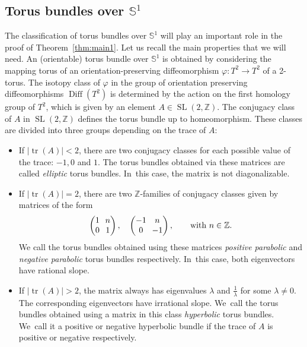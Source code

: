 \documentclass[JEP,XML,SOM,Unicode,NoEqCountersInSection,NoFloatCountersInSection,published]{cedram}
\DeclareMathOperator{\SL}{SL}
\theoremstyle{definition}
\begin{document}
\subsection{Torus bundles over $\mathbb{S}^1$}
The classification of torus bundles over $\mathbb{S}^1$ will play an important role in the proof of Theorem~\ref{thm:main1}. Let us recall the main properties that we will need. An (orientable) torus bundle over $\mathbb{S}^1$ is obtained by considering the mapping torus of an orientation-preserving diffeomorphism $\varphi:T^2\to T^2$ of a 2-torus. The isotopy class of $\varphi$ in the group of orientation preserving diffeomorphisms $\operatorname{Diff}(T^2)$ is determined by the action on the first homology group of $T^2$, which is given by an element $A\in \SL(2,\mathbb{Z})$.
The conjugacy class of $A$ in $\SL(2,\mathbb{Z})$ defines the torus bundle up to homeomorphism. These classes are divided into three groups depending on the trace of $A$:
\begin{itemize}
\item
If $|{\operatorname{tr}(A)}|<2$, there are two conjugacy classes for each possible value of the trace: $-1, 0$ and $1$. The torus bundles obtained via these matrices are called \textit{elliptic} torus bundles. In~this case, the matrix is not diagonalizable.
\item
If $|{\operatorname{tr}(A)}|=2$, there are two $\mathbb{Z}$-families of conjugacy classes given by matrices of the form
\[
\arraycolsep3.5pt
\begin{pmatrix}
1 & n \\
0 & 1
\end{pmatrix},\quad \begin{pmatrix}
-1 & n \\
0 & -1
\end{pmatrix}, \qquad\text{with } n\in \mathbb{Z}.
\]
We call the torus bundles obtained using these matrices \textit{positive parabolic} and \textit{negative parabolic} torus bundles respectively. In~this case, both eigenvectors have rational slope.
\item
If $|{\operatorname{tr}(A)}|>2$, the matrix always has eigenvalues $\lambda$ and $\frac{1}{\lambda}$ for some $\lambda\neq 0$. The corresponding eigenvectors have irrational slope. We~call the torus bundles obtained using a matrix in this class \textit{hyperbolic} torus bundles. We~call it a positive or negative hyperbolic bundle if the trace of $A$ is positive or negative respectively.
\end{itemize}
\end{document}
